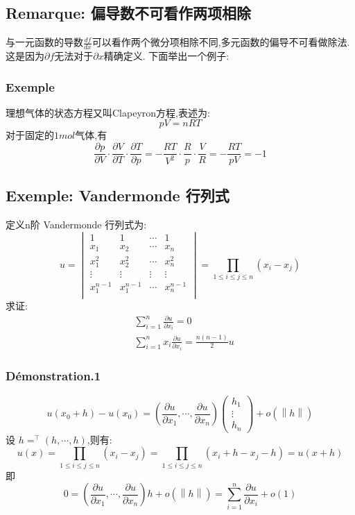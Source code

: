 \documentclass[12pt, a4paper, oneside]{ctexbook}
\begin{document}
\subsection{Remarque: 偏导数不可看作两项相除}
    与一元函数的导数$\frac{d f}{d x}$可以看作两个微分项相除不同,多元函数的偏导不可看做除法.这是因为$\partial f$无法对于$\partial x$精确定义.
    下面举出一个例子:
    \subsubsection{Exemple}
    理想气体的状态方程又叫Clapeyron方程,表述为:
    $$
    pV=nRT
    $$
    对于固定的$1mol$气体,有
    $$
    \frac{\partial p}{\partial V}\cdot\frac{\partial V}{\partial T}\cdot\frac{\partial T}{\partial p}=-\frac{RT}{V^2}\cdot\frac{R}{p}\cdot\frac{V}{R}=-\frac{RT}{pV}=-1
    $$
\subsection{Exemple: Vandermonde 行列式}
    定义n阶 Vandermonde 行列式为:
    $$
    u=\begin{vmatrix}
      1 &1   &\cdots & 1 \\
      x_1 &x_2 & \cdots & x_n  \\
      x_1^2 &x_2^2 & \cdots & x_n^2  \\
      \vdots &\vdots & \vdots & \vdots   \\
      x_1^{n-1} & x_1^{n-1} &\cdots &x_n^{n-1} \\
      \end{vmatrix}
      =\prod _{1\leq i\leq j\leq n}(x_i-x_j)
    $$
    求证:\\
    \begin{align*}
      & \sum_{i = 1}^{n}  \frac{\partial u}{\partial x_i}=0\\
      & \sum_{i = 1}^{n}  x_i \frac{\partial u}{\partial x_i}=\frac{n(n-1)}{2}u
    \end{align*}
    \subsubsection{Démonstration.1}
    $$
    u(x_0+h)-u(x_0)=(\frac{\partial u}{\partial x_1},\cdots,\frac{\partial u}{\partial x_n})
    \begin{pmatrix}
      h_1\\
      \vdots\\
      h_n
     \end{pmatrix}+o(\left\lVert h\right\rVert )
    $$
    设 $ h=^\top(h,\cdots,h)$,则有:
    $$
    u(x)=\prod _{1\leq i\leq j\leq n}(x_i-x_j)=\prod _{1\leq i\leq j\leq n}(x_i+h-x_j-h)=u(x+h)
    $$
    即
    $$
    0=(\frac{\partial u}{\partial x_1},\cdots,\frac{\partial u}{\partial x_n})h+o(\left\lVert h\right\rVert )=\sum_{i = 1}^{n}  \frac{\partial u}{\partial x_i}+o(1)
    $$
\end{document}
